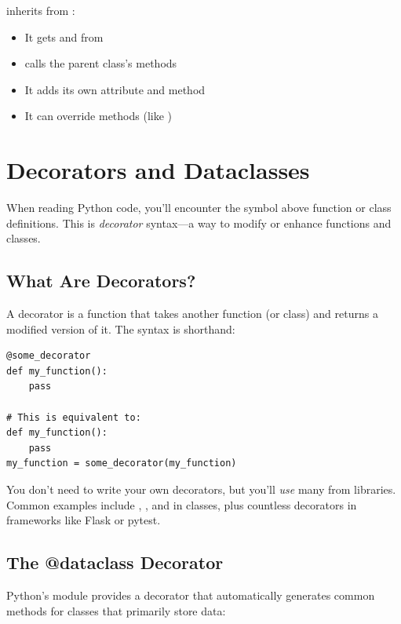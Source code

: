  inherits from :
\begin{itemize}
    \item It gets  and  from 
    \item {} calls the parent class's methods
    \item It adds its own  attribute and  method
    \item It can override methods (like )
\end{itemize}

\section{Decorators and Dataclasses}
\label{sec:decorators-dataclasses}

When reading Python code, you'll encounter the  symbol above function or class definitions. This is \emph{decorator} syntax---a way to modify or enhance functions and classes.

\subsection{What Are Decorators?}

A decorator is a function that takes another function (or class) and returns a modified version of it. The  syntax is shorthand:

\begin{lstlisting}
@some_decorator
def my_function():
    pass

# This is equivalent to:
def my_function():
    pass
my_function = some_decorator(my_function)
\end{lstlisting}

You don't need to write your own decorators, but you'll \emph{use} many from libraries. Common examples include , , and  in classes, plus countless decorators in frameworks like Flask or pytest.

\subsection{The @dataclass Decorator}

Python's  module provides a decorator that automatically generates common methods for classes that primarily store data:

